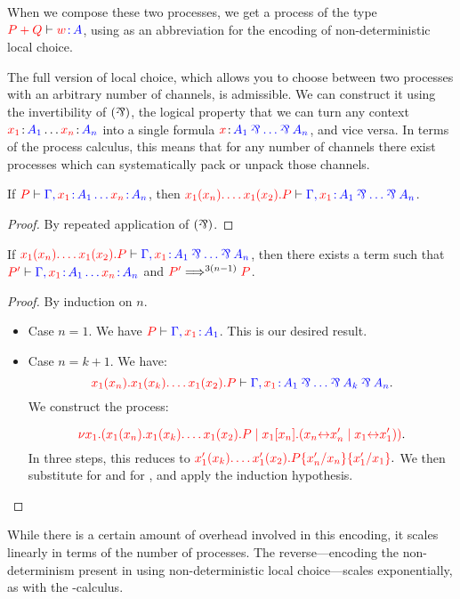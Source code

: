 When we compose these two processes, we get a process of the type
$\seq[{ P + Q}]{ \tmty{w}{A} }$, using  as an abbreviation for the
encoding of non-deterministic local choice.

The full version of local choice, which allows you to choose between two
processes with an arbitrary number of channels, is admissible.
We can construct it using the invertibility of $(\parr)$, the logical property
that we can turn any context $\tmty{x_1}{A_1}\dots\tmty{x_n}{A_n}$ into a single
formula $\tmty{x}{A_1 \parr \dots \parr A_n}$, and vice versa.
In terms of the process calculus, this means that for any number of channels
there exist processes which can systematically pack or unpack those channels.
\begin{lemmaB}
  If $\seq[{ P }]{ \Gamma, \tmty{x_1}{A_1}\dots\tmty{x_n}{A_n} }$, then
  $\seq[{ \cpRecv{x_1}{x_n}{\dots\cpRecv{x_1}{x_2}{P}} }]{
    \Gamma, \tmty{x_1}{A_1 \parr \dots \parr A_n} }$.
\end{lemmaB}
\begin{proof}
  By repeated application of $(\parr)$.
\end{proof}

\begin{lemmaB}
  If $\seq[{ \cpRecv{x_1}{x_n}{\dots\cpRecv{x_1}{x_2}{P}} }]{
    \Gamma, \tmty{x_1}{A_1 \parr \dots \parr A_n} }$, then there exists a term
   such that
  $\seq[{ P' }]{ \Gamma, \tmty{x_1}{A_1}\dots\tmty{x_n}{A_n}}$
  and $\tm{P'} \Longrightarrow^{3(n-1)} \tm{P}$.
\end{lemmaB}
\begin{proof}
  By induction on $n$.
  \begin{itemize}
  \item
    Case $n = 1$.
    We have $\seq[{ P }]{ \Gamma, \tmty{x_1}{A_1} }$.
    This is our desired result.
  \item
    Case $n = k + 1$. We have:
    \[
      \seq[{
      \cpRecv{x_1}{x_n}{\cpRecv{x_1}{x_k}{\dots\cpRecv{x_1}{x_2}{P}}} }]{
      \Gamma, \tmty{x_1}{A_1 \parr \dots \parr A_k \parr A_n} }.
    \]
    We construct the process:

    \[
      \tm{\cpCut{x_1}{
          \cpRecv{x_1}{x_n}{\cpRecv{x_1}{x_k}{\dots\cpRecv{x_1}{x_2}{P}}}}{
          \cpSend{x_1}{x_n}{\cpLink{x_n}{x_n'}}{\cpLink{x_1}{x_1'}}
        }}.
    \]
    In three steps, this reduces to
    \(
      \tm{\cpRecv{x_1'}{x_k}{\dots\cpRecv{x_1'}{x_2}{\cpSub{x_1'}{x_1}{\cpSub{x_n'}{x_n}{P}}}}}.
    \)
    We then substitute  for  and  for , and
    apply the induction hypothesis.
  \end{itemize}
\end{proof}
While there is a certain amount of overhead involved in this encoding, it scales
linearly in terms of the number of processes.
The reverse---encoding the non-determinism present in \nodcap using
non-deterministic local choice---scales exponentially, as with the \textpi-calculus.


